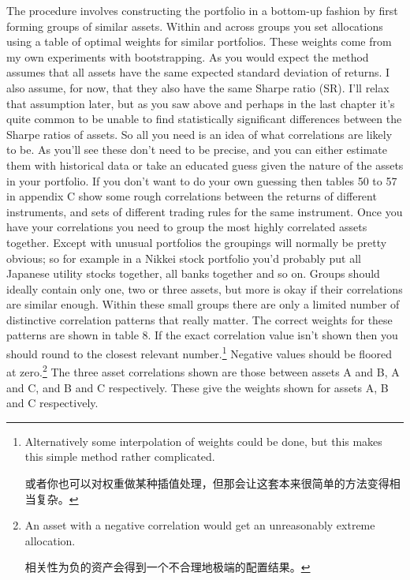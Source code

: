 \begin{englishblock} The procedure involves constructing the portfolio in a bottom-up fashion by first forming groups of similar assets. Within and across groups you set allocations using a table of optimal weights for similar portfolios. These weights come from my own experiments with bootstrapping. As you would expect the method assumes that all assets have the same expected standard deviation of returns. I also assume, for now, that they also have the same Sharpe ratio (SR). I'll relax that assumption later, but as you saw above and perhaps in the last chapter it's quite common to be unable to find statistically significant differences between the Sharpe ratios of assets. So all you need is an idea of what correlations are likely to be. As you'll see these don't need to be precise, and you can either estimate them with historical data or take an educated guess given the nature of the assets in your portfolio. If you don't want to do your own guessing then tables 50 to 57 in appendix C show some rough correlations between the returns of different instruments, and sets of different trading rules for the same instrument. Once you have your correlations you need to group the most highly correlated assets together. Except with unusual portfolios the groupings will normally be pretty obvious; so for example in a Nikkei stock portfolio you'd probably put all Japanese utility stocks together, all banks together and so on. Groups should ideally contain only one, two or three assets, but more is okay if their correlations are similar enough. Within these small groups there are only a limited number of distinctive correlation patterns that really matter. The correct weights for these patterns are shown in table 8. If the exact correlation value isn't shown then you should round to the closest relevant number.\footnote{Alternatively some interpolation of weights could be done, but this makes this simple method rather complicated. \par 或者你也可以对权重做某种插值处理，但那会让这套本来很简单的方法变得相当复杂。} Negative values should be floored at zero.\footnote{An asset with a negative correlation would get an unreasonably extreme allocation. \par 相关性为负的资产会得到一个不合理地极端的配置结果。} The three asset correlations shown are those between assets A and B, A and C, and B and C respectively. These give the weights shown for assets A, B and C respectively. \end{englishblock}

